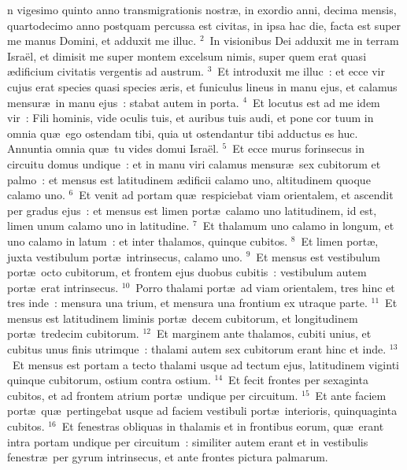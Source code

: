 \bchapter
{}n vigesimo quinto anno transmigrationis nostr\ae , in exordio anni, decima mensis, quartodecimo anno postquam percussa est civitas, in ipsa hac die, facta est super me manus Domini, et adduxit me illuc.
${}^{2}$~In visionibus Dei adduxit me in terram Isra\"el, et dimisit me super montem excelsum nimis, super quem erat quasi \ae dificium civitatis vergentis ad austrum.
${}^{3}$~Et introduxit me illuc~: et ecce vir cujus erat species quasi species \ae ris, et funiculus lineus in manu ejus, et calamus mensur\ae\ in manu ejus~: stabat autem in porta.
${}^{4}$~Et locutus est ad me idem vir~: Fili hominis, vide oculis tuis, et auribus tuis audi, et pone cor tuum in omnia qu\ae\ ego ostendam tibi, quia ut ostendantur tibi adductus es huc. Annuntia omnia qu\ae\ tu vides domui Isra\"el.
${}^{5}$~Et ecce murus forinsecus in circuitu domus undique~: et in manu viri calamus mensur\ae\ sex cubitorum et palmo~: et mensus est latitudinem \ae dificii calamo uno, altitudinem quoque calamo uno.
${}^{6}$~Et venit ad portam qu\ae\ respiciebat viam orientalem, et ascendit per gradus ejus~: et mensus est limen port\ae\ calamo uno latitudinem, id est, limen unum calamo uno in latitudine.
${}^{7}$~Et thalamum uno calamo in longum, et uno calamo in latum~: et inter thalamos, quinque cubitos.
${}^{8}$~Et limen port\ae , juxta vestibulum port\ae\ intrinsecus, calamo uno.
${}^{9}$~Et mensus est vestibulum port\ae\ octo cubitorum, et frontem ejus duobus cubitis~: vestibulum autem port\ae\ erat intrinsecus.
${}^{10}$~Porro thalami port\ae\ ad viam orientalem, tres hinc et tres inde~: mensura una trium, et mensura una frontium ex utraque parte.
${}^{11}$~Et mensus est latitudinem liminis port\ae\ decem cubitorum, et longitudinem port\ae\ tredecim cubitorum.
${}^{12}$~Et marginem ante thalamos, cubiti unius, et cubitus unus finis utrimque~: thalami autem sex cubitorum erant hinc et inde.
${}^{13}$~Et mensus est portam a tecto thalami usque ad tectum ejus, latitudinem viginti quinque cubitorum, ostium contra ostium.
${}^{14}$~Et fecit frontes per sexaginta cubitos, et ad frontem atrium port\ae\ undique per circuitum.
${}^{15}$~Et ante faciem port\ae\ qu\ae\ pertingebat usque ad faciem vestibuli port\ae\ interioris, quinquaginta cubitos.
${}^{16}$~Et fenestras obliquas in thalamis et in frontibus eorum, qu\ae\ erant intra portam undique per circuitum~: similiter autem erant et in vestibulis fenestr\ae\ per gyrum intrinsecus, et ante frontes pictura palmarum.


